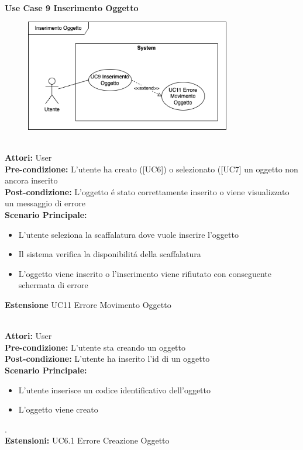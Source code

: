 \vspace{0.5cm}


\Large\textbf{}\\
\Large\textbf{Use Case 9 Inserimento Oggetto} \\
\begin{figure}[h]
 \centering
  \includegraphics[width=0.8\textwidth]{UseCasesImages/ObjInsert.drawio.png}
\end{figure}

\vspace{0.5cm}

\large\textbf{} \\
\textbf{Attori:} User\\
\textbf{Pre-condizione:} L'utente ha creato ([UC6]) o selezionato ([UC7] un oggetto non ancora inserito  \\
\textbf{Post-condizione: } L'oggetto é stato correttamente inserito o viene visualizzato un messaggio di errore\\
\textbf{Scenario Principale:} 
\begin{itemize}
    \item L'utente seleziona la scaffalatura dove vuole inserire l'oggetto 
    \item Il sistema verifica la disponibilitá della scaffalatura
    \item L'oggetto viene inserito o l'inserimento viene rifiutato con conseguente schermata di errore
\end{itemize}
\textbf{Estensione} UC11 Errore Movimento Oggetto


\large\textbf{} \\
\textbf{Attori:} User\\
\textbf{Pre-condizione:} L'utente sta creando un oggetto \\
\textbf{Post-condizione: } L'utente ha inserito l'id di un oggetto\\
\textbf{Scenario Principale:}\\
\begin{itemize}
  \item L'utente inserisce un codice identificativo dell'oggetto
  \item L'oggetto viene creato
\end{itemize}.\\
\textbf{Estensioni: } UC6.1 Errore Creazione Oggetto\\


